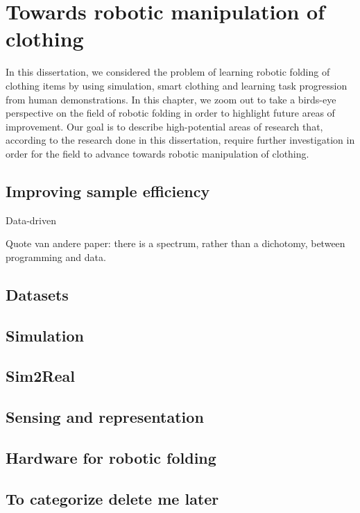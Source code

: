 \documentclass[\home/main.tex]{subfiles}
\begin{document}

\chapter{Towards robotic manipulation of clothing}\label{ch:towards_robotic_folding}

In this dissertation, we considered the problem of learning robotic folding of clothing items by using simulation, smart clothing and learning task progression from human demonstrations. In this chapter, we zoom out to take a birds-eye perspective on the field of robotic folding in order to highlight future areas of improvement. Our goal is to describe high-potential areas of research that, according to the research done in this dissertation, require further investigation in order for the field to advance towards robotic manipulation of clothing.

\section{Improving sample efficiency}

Data-driven 

Quote van andere paper: there is a spectrum, rather than a dichotomy, between programming and data.

\section{Datasets}

\section{Simulation}

\section{Sim2Real}

\section{Sensing and representation}

\section{Hardware for robotic folding}

\section{To categorize delete me later}
\end{document}

